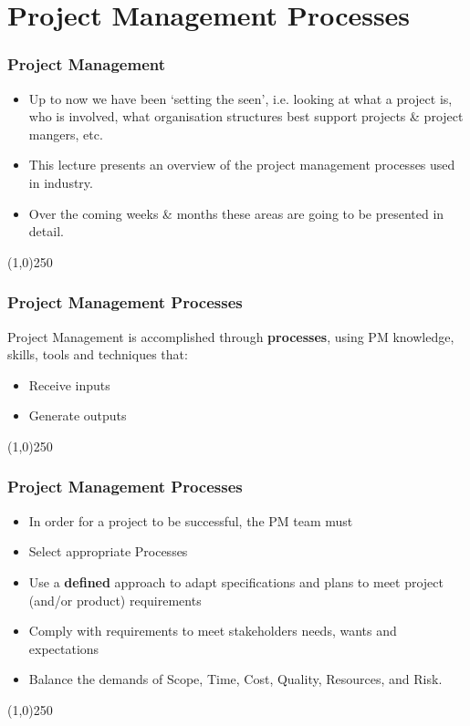 \section{Project Management Processes}


\begin{frame}
\frametitle{Project Management}
\begin{itemize}
	\item Up to now we have been `setting the seen', i.e. looking at what a project is, who is involved, what organisation structures best support projects \& project mangers, etc.
	\item This lecture presents an overview of the project management processes used in industry.  
	\item Over the coming weeks \& months these areas are going to be presented in detail.
\end{itemize}
\end{frame}
\begin{center}\line(1,0){250}\end{center}



\begin{frame}
\frametitle{Project Management Processes}
Project Management is accomplished through \textbf{processes}, using PM knowledge, skills, tools and techniques that:\\
\begin{itemize}
	\item Receive inputs
	\item Generate outputs
\end{itemize}
\end{frame}
\begin{center}\line(1,0){250}\end{center}



\begin{frame}
\frametitle{Project Management Processes}
\begin{itemize}
	\item In order for a project to be successful, the PM team must\\
	\item Select appropriate Processes
	\item Use a \textbf{defined} approach to adapt specifications and plans to meet project (and/or product) requirements
	\item Comply with requirements to meet stakeholders needs, wants and expectations
	\item Balance the demands of Scope, Time, Cost, Quality, Resources, and Risk.
\end{itemize}
\end{frame}
\begin{center}\line(1,0){250}\end{center}



